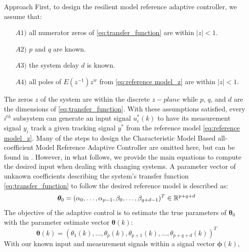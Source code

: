 \begin{section}{Approach}
First, to design the resilient model reference adaptive controller, we assume that:
	\begin{enumerate}[leftmargin=3\parindent]
	\item[$A1)$] all numerator zeros of \eqref{eq:transfer_function} are within $|z|<1$.
	\item[$A2)$] $p$ and $q$ are known. 
	\item[$A3)$] the system delay $d$ is known.
	\item[$A4)$] all poles of $E(z^{-1})z^w$ from \eqref{eq:reference model_z} are within $|z|<1$.
	\end{enumerate}
The zeros $z$ of the system are within the discrete $z-plane$ while $p$, $q$, and $d$ are the dimensions of \eqref{eq:transfer_function}. With these assumptions satisfied, every $i^{th}$ subsystem can generate an input signal $u^*_i(k)$ to have its measurement signal $y_i$ track a given tracking signal $y^*$ from the reference model \eqref{eq:reference model_z}. Many of the steps to design the Characteristic Model Based all-coefficient Model Reference Adaptive Controller are omitted here, but can be found in \cite{tao2003adaptive,Goodwin1643720}. However, in what follows, we provide the main equations to compute the desired input when dealing with changing systems. A parameter vector of unknown coefficients describing the system's transfer function \eqref{eq:transfer_function} to follow the desired reference model is described as:
    \begin{equation}
	\bm{\theta}_0=(\alpha_0, \dots ,\alpha_{p-1},\beta_0, \dots ,\beta_{q+d-1})^T \in \mathbb{R}^{p+q+d}
	\end{equation}
The objective of the adaptive control is to estimate the true parameters of $\bm{\theta}_0$ with the parameter estimate vector $\bm{\theta}(k)$:
    \begin{equation}
    \bm{\theta}(k)=(\theta_1(k), \dots ,\theta_p(k),\theta_{p+1}(k), \dots ,\theta_{p+q+d}(k))^T
	\end{equation}
With our known input and measurement signals within a signal vector $\bm{\phi}(k)$,
    

\end{section}
